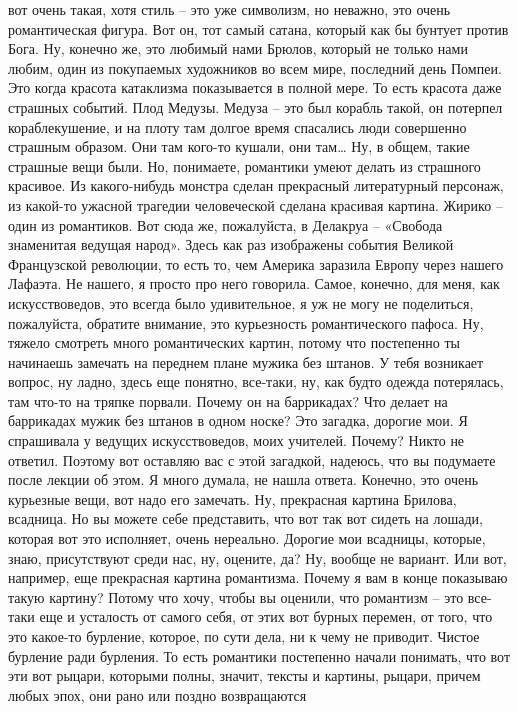 вот очень такая, хотя стиль – это уже символизм, но неважно, это очень
романтическая фигура. Вот он, тот самый сатана, который как бы бунтует против
Бога. Ну, конечно же, это любимый нами Брюлов, который не только нами любим,
один из покупаемых художников во всем мире, последний день Помпеи. Это когда
красота катаклизма показывается в полной мере. То есть красота даже страшных
событий. Плод Медузы. Медуза – это был корабль такой, он потерпел
кораблекушение, и на плоту там долгое время спасались люди совершенно страшным
образом. Они там кого-то кушали, они там… Ну, в общем, такие страшные вещи были.
Но, понимаете, романтики умеют делать из страшного красивое. Из какого-нибудь
монстра сделан прекрасный литературный персонаж, из какой-то ужасной трагедии
человеческой сделана красивая картина. Жирико – один из романтиков. Вот сюда же,
пожалуйста, в Делакруа – «Свобода знаменитая ведущая народ». Здесь как раз
изображены события Великой Французской революции, то есть то, чем Америка
заразила Европу через нашего Лафаэта. Не нашего, я просто про него говорила.
Самое, конечно, для меня, как искусствоведов, это всегда было удивительное, я уж
не могу не поделиться, пожалуйста, обратите внимание, это курьезность
романтического пафоса. Ну, тяжело смотреть много романтических картин, потому
что постепенно ты начинаешь замечать на переднем плане мужика без штанов. У тебя
возникает вопрос, ну ладно, здесь еще понятно, все-таки, ну, как будто одежда
потерялась, там что-то на тряпке порвали. Почему он на баррикадах? Что делает на
баррикадах мужик без штанов в одном носке? Это загадка, дорогие мои. Я
спрашивала у ведущих искусствоведов, моих учителей. Почему? Никто не ответил.
Поэтому вот оставляю вас с этой загадкой, надеюсь, что вы подумаете после лекции
об этом. Я много думала, не нашла ответа. Конечно, это очень курьезные вещи, вот
надо его замечать. Ну, прекрасная картина Брилова, всадница. Но вы можете себе
представить, что вот так вот сидеть на лошади, которая вот это исполняет, очень
нереально. Дорогие мои всадницы, которые, знаю, присутствуют среди нас, ну,
оцените, да? Ну, вообще не вариант. Или вот, например, еще прекрасная картина
романтизма. Почему я вам в конце показываю такую картину? Потому что хочу, чтобы
вы оценили, что романтизм – это все-таки еще и усталость от самого себя, от этих
вот бурных перемен, от того, что это какое-то бурление, которое, по сути дела,
ни к чему не приводит. Чистое бурление ради бурления. То есть романтики
постепенно начали понимать, что вот эти вот рыцари, которыми полны, значит,
тексты и картины, рыцари, причем любых эпох, они рано или поздно возвращаются
